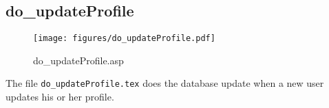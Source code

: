 \subsection{do\_updateProfile}
\begin{figure}[htb]
    \begin{center}
        \texttt{[image: figures/do\_updateProfile.pdf]}
    \end{center}
    \caption{do\_updateProfile.asp}
    \label{fig:do_updateProfile}
\end{figure}

The file \verb|do_updateProfile.tex| does the database update when a new user
updates his or her profile.

